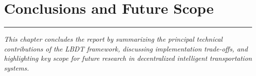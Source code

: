 \documentclass[12pt,phd,times]{pkmthesis}
\begin{document}
\chapter{Conclusions and Future Scope}
\vspace{-1cm}
\noindent \rule{\textwidth}{0.01in}
\emph{This chapter concludes the report by summarizing the principal technical contributions of the LBDT framework, discussing implementation trade-offs, and highlighting key scope for future research in decentralized intelligent transportation systems.}
\label{chap:cons_fscope}
%  
%
%
%
%
%
%
\end{document}
